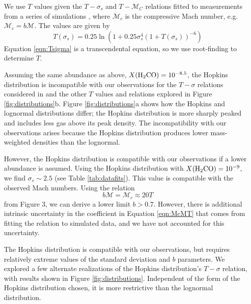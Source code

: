 We use $T$ values given the $T-\sigma_s$ and $T-\mathcal{M}_C$
relations fitted to measurements from a series of simulations
\citep{Kowal2007a,Kritsuk2007a,Schmidt2009a,Federrath2010a,Konstandin2012a,Molina2012a,Federrath2013b}, 
where $\mathcal{M}_c$ is the compressive Mach number, e.g. $\mathcal{M}_c = b \mathcal{M}$.
The values are given by
\begin{equation} 
    \label{eqn:Tsigma}
    T(\sigma_s) = 0.25 \ln (1+0.25 \sigma_s^4 \left(1+T(\sigma_s)\right)^{-6})
\end{equation}
Equation \ref{eqn:Tsigma}
is a transcendental equation, so we use root-finding to determine $T$.  

Assuming the same abundance as above, $X(\textrm{H}_2\textrm{CO})=10^{-8.5}$, the Hopkins
distribution is incompatible with our observations for the $T-\sigma$ relations considered
in \citet{Hopkins2013a} and the other $T$ values and relations explored in Figure \ref{fig:distributions}b.
Figure \ref{fig:distributions}a shows how the Hopkins
and lognormal distributions differ; the Hopkins distribution is more sharply
peaked and includes less gas above its peak density.  The incompatibility with
our observations arises because the Hopkins distribution produces lower
mass-weighted densities than the lognormal. 

However, the
Hopkins distribution is compatible with our observations if a lower abundance is assumed.
Using the Hopkins distribution with $X(\textrm{H}_2\textrm{CO})=10^{-9}$, we find
$\sigma_s\sim2.5$ (see Table \ref{tab:datafits}).  This value is compatible
with the observed Mach numbers.  Using the relation 
\begin{equation}
    \label{eqn:McMT}
    b \mathcal{M} = \mathcal{M}_c  \approx 20 T
\end{equation}
from \citet{Hopkins2013a} Figure 3, we can derive a lower limit $b>0.7$.
However, there is additional intrinsic uncertainty in the coefficient in
Equation \ref{eqn:McMT} that comes from fitting the relation to simulated data,
and we have not accounted for this uncertainty.  %

The Hopkins distribution is compatible with our observations, but requires
relatively extreme values of the standard deviation and $b$ parameters.  
We explored a few alternate realizations of the Hopkins distribution's
$T-\sigma$ relation, with results shown in Figure \ref{fig:distributions}.
Independent of the form of the Hopkins distribution chosen, it is more
restrictive than the lognormal distribution.


